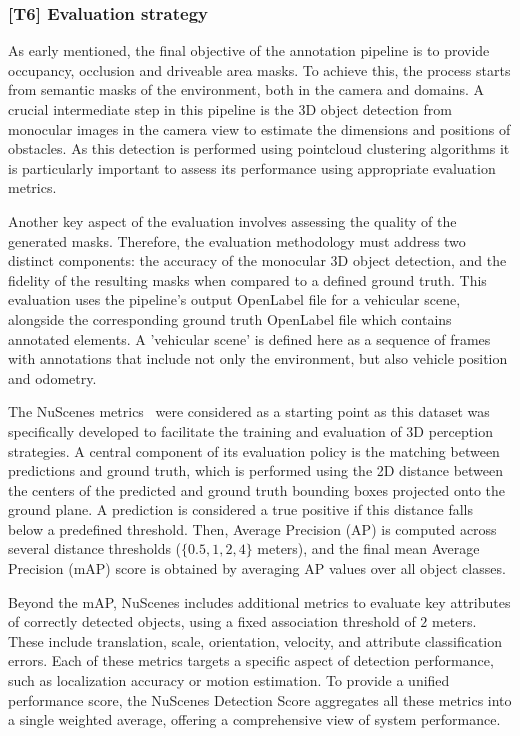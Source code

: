 \subsubsection{[T6] Evaluation strategy}
As early mentioned, the final objective of the annotation pipeline is to provide occupancy, occlusion and driveable area masks. To achieve this, the process starts from semantic masks of the environment, both in the camera and  domains. A crucial intermediate step in this pipeline is the 3D object detection from monocular images in the camera view to estimate the dimensions and positions of obstacles. As this detection is performed using pointcloud clustering algorithms it is particularly important to assess its performance using appropriate evaluation metrics.

Another key aspect of the evaluation involves assessing the quality of the generated  masks. Therefore, the evaluation methodology must address two distinct components: the accuracy of the monocular 3D object detection, and the fidelity of the resulting  masks when compared to a defined ground truth. This evaluation uses the pipeline's output OpenLabel file for a vehicular scene, alongside the corresponding ground truth OpenLabel file which contains annotated elements. A 'vehicular scene' is defined here as a sequence of frames with annotations that include not only the environment, but also vehicle position and odometry.

 \label{sec:3d_det_evaluation}

The NuScenes metrics~\cite{nuscenes} were considered as a starting point as this dataset was specifically developed to facilitate the training and evaluation of 3D perception strategies. A central component of its evaluation policy is the matching between predictions and ground truth, which is performed using the 2D distance between the centers of the predicted and ground truth bounding boxes projected onto the ground plane. A prediction is considered a true positive if this distance falls below a predefined threshold. Then, Average Precision (AP) is computed across several distance thresholds ($\{0.5, 1, 2, 4\}$ meters), and the final mean Average Precision (mAP) score is obtained by averaging AP values over all object classes.

Beyond the mAP, NuScenes includes additional metrics to evaluate key attributes of correctly detected objects, using a fixed association threshold of $2$ meters. These include translation, scale, orientation, velocity, and attribute classification errors. Each of these metrics targets a specific aspect of detection performance, such as localization accuracy or motion estimation. To provide a unified performance score, the NuScenes Detection Score aggregates all these metrics into a single weighted average, offering a comprehensive view of system performance.

